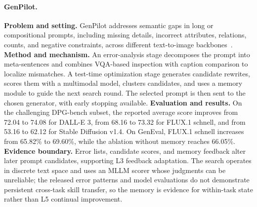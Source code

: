 \paragraph{GenPilot.}
\textbf{Problem and setting.} GenPilot addresses semantic gaps in long or compositional prompts, including missing details, incorrect attributes, relations, counts, and negative constraints, across different text-to-image backbones~\cite{avg251007217}. \textbf{Method and mechanism.} An error-analysis stage decomposes the prompt into meta-sentences and combines VQA-based inspection with caption comparison to localize mismatches. A test-time optimization stage generates candidate rewrites, scores them with a multimodal model, clusters candidates, and uses a memory module to guide the next search round. The selected prompt is then sent to the chosen generator, with early stopping available. \textbf{Evaluation and results.} On the challenging DPG-bench subset, the reported average score improves from 72.04 to 74.08 for DALL-E 3, from 68.16 to 73.32 for FLUX.1 schnell, and from 53.16 to 62.12 for Stable Diffusion v1.4. On GenEval, FLUX.1 schnell increases from 65.82\% to 69.60\%, while the ablation without memory reaches 66.05\%. \textbf{Evidence boundary.} Error lists, candidate scores, and memory feedback alter later prompt candidates, supporting L3 feedback adaptation. The search operates in discrete text space and uses an MLLM scorer whose judgments can be unreliable; the released error patterns and model evaluations do not demonstrate persistent cross-task skill transfer, so the memory is evidence for within-task state rather than L5 continual improvement.

